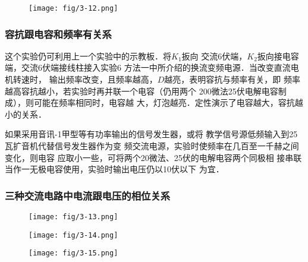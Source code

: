 \begin{figure}[htp]
    \centering
\texttt{[image: fig/3-12.png]}
    \caption{}
\end{figure}

\subsubsection{容抗跟电容和频率有关系}
这个实验仍可利用上一个实验中的示教板．将$K_1$扳向
交流6伏端，$K_2$扳向接电容端，交流6伏端接线柱接入实验6
方法一中所介绍的换流变频电源．当改变直流电机转速时，
输出频率改变，且频率越高，$D$越亮，表明容抗与频率有关，即
频率越高容抗越小，若实验时再并联一个电容（仍用两个
200微法25伏电解电容制成），则可能在频率相同时，电容越
大，灯泡越亮．定性演示了电容越大，容抗越小的关系．

如果采用音讯-1甲型等有功率输出的信号发生器，或将
教学信号源低频输入到25瓦扩音机代替信号发生器作为变
频交流电源，实验时使频率在几百至一千赫之间变化，则电容
应取小一些，可将两个20微法、25伏的电解电容两个同极相
接串联当作一无极电容使用，实验时输出电压仍以10伏以下
为宜．

\subsubsection{三种交流电路中电流跟电压的相位关系}

\begin{figure}[htp]\centering
    \begin{minipage}[t]{0.48\textwidth}
    \centering
    \texttt{[image: fig/3-13.png]}
    \caption{}
    \end{minipage}
    \begin{minipage}[t]{0.48\textwidth}
    \centering    \texttt{[image: fig/3-14.png]}
    \caption{}
    \end{minipage}
    \end{figure}

    \begin{figure}[htp]
        \centering
    \texttt{[image: fig/3-15.png]}
        \caption{}
    \end{figure}

